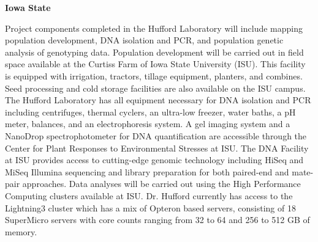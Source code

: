 \textbf{Iowa State}

Project components completed in the Hufford Laboratory will include mapping population development, DNA isolation and PCR, and population genetic analysis of genotyping data. Population development will be carried out in field space available at the Curtiss Farm of Iowa State University (ISU).  This facility is equipped with irrigation, tractors, tillage equipment, planters, and combines.  Seed processing and cold storage facilities are also available on the ISU campus.  The Hufford Laboratory has all equipment necessary for DNA isolation and PCR including centrifuges, thermal cyclers, an ultra-low freezer, water baths, a pH meter, balances, and an electrophoresis system. A gel imaging system and a NanoDrop spectrophotometer for DNA quantification are accessible through the Center for Plant Responses to Environmental Stresses at ISU. The DNA Facility at ISU provides access to cutting-edge genomic technology including HiSeq and MiSeq Illumina sequencing and library preparation for both paired-end and mate-pair approaches.  Data analyses will be carried out using the High Performance Computing clusters available at ISU. Dr. Hufford currently has access to the Lightning3 cluster which has a mix of Opteron based servers, consisting of 18 SuperMicro servers with core counts ranging from 32 to 64 and 256 to 512 GB of memory.

